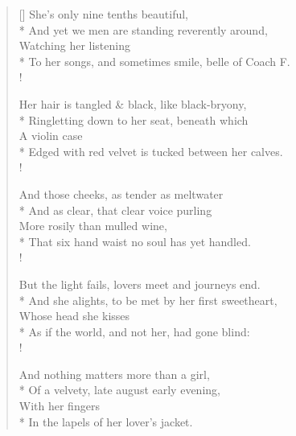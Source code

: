 \settowidth{\versewidth}{To her tapes, and sometimes smile, belle of Coach F.}
\begin{verse}[\versewidth]
She's only nine tenths beautiful,\\*
\vin And yet we men are standing reverently around,\\
\vin \vin Watching her listening\\*
To her songs, and sometimes smile, belle of Coach F.\\!

Her hair is tangled \& black, like black-bryony,\\*
\vin Ringletting down to her seat, beneath which\\
\vin \vin A violin case\\*
Edged with red velvet is tucked between her calves.\\!

And those cheeks, as tender as meltwater\\*
\vin And as clear, that clear voice purling\\
\vin \vin More rosily than mulled wine,\\*
That six hand waist no soul has yet handled.\\!

But the light fails, lovers meet and journeys end.\\*
\vin And she alights, to be met by her first sweetheart,\\
\vin \vin Whose head she kisses\\*
As if the world, and not her, had gone blind:\\!

And nothing matters more than a girl,\\*
\vin Of a velvety, late august early evening,\\
\vin \vin With her fingers\\*
In the lapels of her lover's jacket.
\end{verse}

\bigskip

\begin{minipage}{\textwidth}
\end{minipage}
